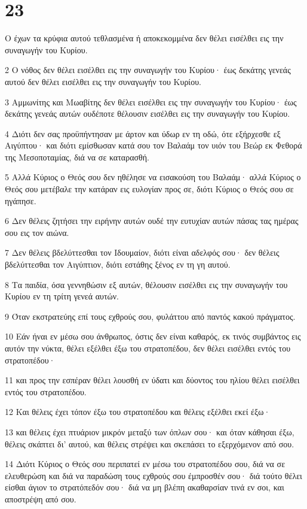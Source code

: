 \chapter{23}

\par Ο έχων τα κρύφια αυτού τεθλασμένα ή αποκεκομμένα δεν θέλει εισέλθει εις την συναγωγήν του Κυρίου.
\par 2 Ο νόθος δεν θέλει εισέλθει εις την συναγωγήν του Κυρίου· έως δεκάτης γενεάς αυτού δεν θέλει εισέλθει εις την συναγωγήν του Κυρίου.
\par 3 Αμμωνίτης και Μωαβίτης δεν θέλει εισέλθει εις την συναγωγήν του Κυρίου· έως δεκάτης γενεάς αυτών ουδέποτε θέλουσιν εισέλθει εις την συναγωγήν του Κυρίου.
\par 4 Διότι δεν σας προϋπήντησαν με άρτον και ύδωρ εν τη οδώ, ότε εξήρχεσθε εξ Αιγύπτου· και διότι εμίσθωσαν κατά σου τον Βαλαάμ τον υιόν του Βεώρ εκ Φεθορά της Μεσοποταμίας, διά να σε καταρασθή.
\par 5 Αλλά Κύριος ο Θεός σου δεν ηθέλησε να εισακούση του Βαλαάμ· αλλά Κύριος ο Θεός σου μετέβαλε την κατάραν εις ευλογίαν προς σε, διότι Κύριος ο Θεός σου σε ηγάπησε.
\par 6 Δεν θέλεις ζητήσει την ειρήνην αυτών ουδέ την ευτυχίαν αυτών πάσας τας ημέρας σου εις τον αιώνα.
\par 7 Δεν θέλεις βδελύττεσθαι τον Ιδουμαίον, διότι είναι αδελφός σου· δεν θέλεις βδελύττεσθαι τον Αιγύπτιον, διότι εστάθης ξένος εν τη γη αυτού.
\par 8 Τα παιδία, όσα γεννηθώσιν εξ αυτών, θέλουσιν εισέλθει εις την συναγωγήν του Κυρίου εν τη τρίτη γενεά αυτών.
\par 9 Όταν εκστρατεύης επί τους εχθρούς σου, φυλάττου από παντός κακού πράγματος.
\par 10 Εάν ήναι εν μέσω σου άνθρωπος, όστις δεν είναι καθαρός, εκ τινός συμβάντος εις αυτόν την νύκτα, θέλει εξέλθει έξω του στρατοπέδου, δεν θέλει εισέλθει εντός του στρατοπέδου·
\par 11 και προς την εσπέραν θέλει λουσθή εν ύδατι και δύοντος του ηλίου θέλει εισέλθει εντός του στρατοπέδου.
\par 12 Και θέλεις έχει τόπον έξω του στρατοπέδου και θέλεις εξέλθει εκεί έξω·
\par 13 και θέλεις έχει πτυάριον μικρόν μεταξύ των όπλων σου· και όταν κάθησαι έξω, θέλεις σκάπτει δι' αυτού, και θέλεις στρέψει και σκεπάσει το εξερχόμενον από σου.
\par 14 Διότι Κύριος ο Θεός σου περιπατεί εν μέσω του στρατοπέδου σου, διά να σε ελευθερώση και διά να παραδώση τους εχθρούς σου έμπροσθέν σου· διά τούτο θέλει είσθαι άγιον το στρατόπεδόν σου· διά να μη βλέπη ακαθαρσίαν τινά εν σοι, και αποστρέψη από σου.
